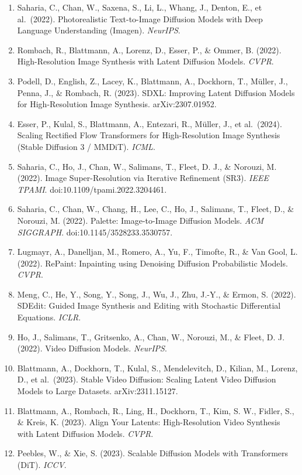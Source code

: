\begin{enumerate}
\item
  Saharia, C., Chan, W., Saxena, S., Li, L., Whang, J., Denton, E., et al.~(2022). Photorealistic Text-to-Image Diffusion Models with Deep Language Understanding (Imagen). \emph{NeurIPS}.
\item
  Rombach, R., Blattmann, A., Lorenz, D., Esser, P., \& Ommer, B. (2022). High-Resolution Image Synthesis with Latent Diffusion Models. \emph{CVPR}.
\item
  Podell, D., English, Z., Lacey, K., Blattmann, A., Dockhorn, T., Müller, J., Penna, J., \& Rombach, R. (2023). SDXL: Improving Latent Diffusion Models for High-Resolution Image Synthesis. arXiv:2307.01952.
\item
  Esser, P., Kulal, S., Blattmann, A., Entezari, R., Müller, J., et al.~(2024). Scaling Rectified Flow Transformers for High-Resolution Image Synthesis (Stable Diffusion 3 / MMDiT). \emph{ICML}.
\item
  Saharia, C., Ho, J., Chan, W., Salimans, T., Fleet, D. J., \& Norouzi, M. (2022). Image Super-Resolution via Iterative Refinement (SR3). \emph{IEEE TPAMI}. doi:10.1109/tpami.2022.3204461.
\item
  Saharia, C., Chan, W., Chang, H., Lee, C., Ho, J., Salimans, T., Fleet, D., \& Norouzi, M. (2022). Palette: Image-to-Image Diffusion Models. \emph{ACM SIGGRAPH}. doi:10.1145/3528233.3530757.
\item
  Lugmayr, A., Danelljan, M., Romero, A., Yu, F., Timofte, R., \& Van Gool, L. (2022). RePaint: Inpainting using Denoising Diffusion Probabilistic Models. \emph{CVPR}.
\item
  Meng, C., He, Y., Song, Y., Song, J., Wu, J., Zhu, J.-Y., \& Ermon, S. (2022). SDEdit: Guided Image Synthesis and Editing with Stochastic Differential Equations. \emph{ICLR}.
\item
  Ho, J., Salimans, T., Gritsenko, A., Chan, W., Norouzi, M., \& Fleet, D. J. (2022). Video Diffusion Models. \emph{NeurIPS}.
\item
  Blattmann, A., Dockhorn, T., Kulal, S., Mendelevitch, D., Kilian, M., Lorenz, D., et al.~(2023). Stable Video Diffusion: Scaling Latent Video Diffusion Models to Large Datasets. arXiv:2311.15127.
\item
  Blattmann, A., Rombach, R., Ling, H., Dockhorn, T., Kim, S. W., Fidler, S., \& Kreis, K. (2023). Align Your Latents: High-Resolution Video Synthesis with Latent Diffusion Models. \emph{CVPR}.
\item
  Peebles, W., \& Xie, S. (2023). Scalable Diffusion Models with Transformers (DiT). \emph{ICCV}.

\end{enumerate}

